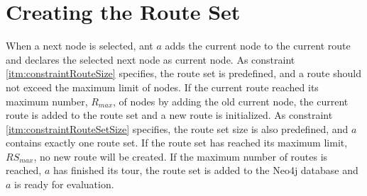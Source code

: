 \section{Creating the Route Set}
\label{sec:algoCreatingRouteSet}

When a next node is selected, ant $a$ adds the current node to the current route and declares the selected next node as current node. As constraint \vref{itm:constraintRouteSize} specifies, the route set is predefined, and a route should not exceed the maximum limit of nodes. If the current route reached its maximum number, $R_{max}$, of nodes by adding the old current node, the current route is added to the route set and a new route is initialized. As constraint \vref{itm:constraintRouteSetSize} specifies, the route set size is also predefined, and $a$ contains exactly one route set. If the route set has reached its maximum limit, $RS_{max}$, no new route will be created. If the maximum number of routes is reached, $a$ has finished its tour, the route set is added to the Neo4j database and $a$ is ready for evaluation. 